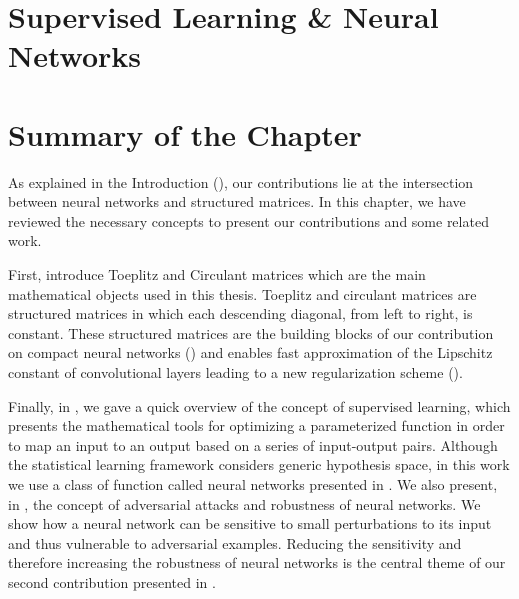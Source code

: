 \section{Supervised Learning \& Neural Networks}
\label{section:ch2-supervised_learning_neural_networks}



\section{Summary of the Chapter}
\label{section:ch2-summary_of_the_background}

As explained in the Introduction (), our contributions lie at the intersection between neural networks and structured matrices.
In this chapter, we have reviewed the necessary concepts to present our contributions and some related work.

First,  introduce Toeplitz and Circulant matrices which are the main mathematical objects used in this thesis.
Toeplitz and circulant matrices are structured matrices in which each descending diagonal, from left to right, is constant.
These structured matrices are the building blocks of our contribution on compact neural networks () and enables fast approximation of the Lipschitz constant of convolutional layers leading to a new regularization scheme ().

Finally, in , we gave a quick overview of the concept of supervised learning, which presents the mathematical tools for optimizing a parameterized function in order to map an input to an output based on a series of input-output pairs. 
Although the statistical learning framework considers generic hypothesis space, in this work we use a class of function called neural networks presented in .
We also present, in , the concept of adversarial attacks and robustness of neural networks.
We show how a neural network can be sensitive to small perturbations to its input and thus vulnerable to adversarial examples.
Reducing the sensitivity and therefore increasing the robustness of neural networks is the central theme of our second contribution presented in .





